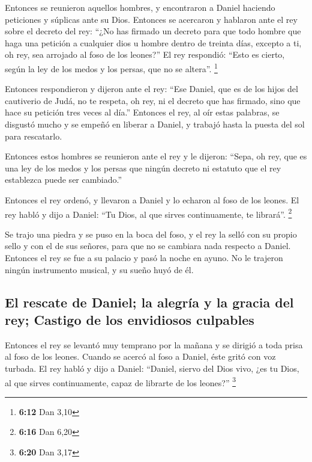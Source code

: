 Entonces se reunieron aquellos hombres, y encontraron a
Daniel haciendo peticiones y súplicas ante su Dios. 
Entonces se acercaron y hablaron ante el rey sobre el decreto del rey:
``¿No has firmado un decreto para que todo hombre que haga una petición
a cualquier dios u hombre dentro de treinta días, excepto a ti, oh rey,
sea arrojado al foso de los leones?'' El rey respondió: ``Esto es
cierto, según la ley de los medos y los persas, que no se altera''.
\footnote{\textbf{6:12} Dan 3,10}

 Entonces respondieron y dijeron ante el rey: ``Ese
Daniel, que es de los hijos del cautiverio de Judá, no te respeta, oh
rey, ni el decreto que has firmado, sino que hace su petición tres veces
al día.''  Entonces el rey, al oír estas palabras, se
disgustó mucho y se empeñó en liberar a Daniel, y trabajó hasta la
puesta del sol para rescatarlo.

 Entonces estos hombres se reunieron ante el rey y le
dijeron: ``Sepa, oh rey, que es una ley de los medos y los persas que
ningún decreto ni estatuto que el rey establezca puede ser cambiado.''

 Entonces el rey ordenó, y llevaron a Daniel y lo echaron
al foso de los leones. El rey habló y dijo a Daniel: ``Tu Dios, al que
sirves continuamente, te librará''. \footnote{\textbf{6:16} Dan 6,20}

 Se trajo una piedra y se puso en la boca del foso, y el
rey la selló con su propio sello y con el de sus señores, para que no se
cambiara nada respecto a Daniel.  Entonces el rey se fue
a su palacio y pasó la noche en ayuno. No le trajeron ningún instrumento
musical, y su sueño huyó de él.

\hypertarget{el-rescate-de-daniel-la-alegruxeda-y-la-gracia-del-rey-castigo-de-los-envidiosos-culpables}{%
\subsection{El rescate de Daniel; la alegría y la gracia del rey;
Castigo de los envidiosos
culpables}\label{el-rescate-de-daniel-la-alegruxeda-y-la-gracia-del-rey-castigo-de-los-envidiosos-culpables}}

 Entonces el rey se levantó muy temprano por la mañana y
se dirigió a toda prisa al foso de los leones.  Cuando se
acercó al foso a Daniel, éste gritó con voz turbada. El rey habló y dijo
a Daniel: ``Daniel, siervo del Dios vivo, ¿es tu Dios, al que sirves
continuamente, capaz de librarte de los leones?'' \footnote{\textbf{6:20}
  Dan 3,17}

